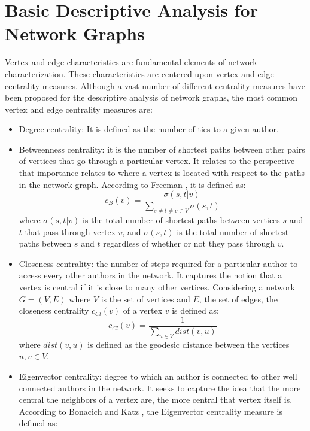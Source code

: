 \section{Basic Descriptive Analysis for Network Graphs}
\label{sec:back_desc}
Vertex and edge characteristics are fundamental elements of network characterization. These characteristics are centered upon vertex and edge centrality measures. Although a vast number of different centrality measures have been proposed for the descriptive analysis of network graphs, the most common vertex and edge centrality measures are:
\begin{itemize}
\item Degree centrality: It is defined as the number of ties to a given author.
\item Betweenness centrality: it is the number of shortest paths between other pairs of vertices that go through a particular vertex. It relates to the perspective that importance relates to where a vertex is located with respect to the paths in the network graph. According to Freeman \cite{freeman_set_1977}, it is defined as:
\begin{equation} 
c_{B}(v)=\frac{\sigma (s,t|v)}{\sum_{s \neq t \neq v \in V}\sigma (s,t)} 
\end{equation} where $\sigma(s,t|v)$ is the total number of shortest paths between vertices $s$ and $t$ that pass through vertex $v$, and $\sigma (s,t)$ is the total number of shortest paths between $s$ and $t$ regardless of whether or not they pass through $v$.
\item Closeness centrality: the number of steps required for a particular author to access every other authors in the network. It captures the notion that a vertex is central if it is close to many other vertices. Considering a network $G=(V,E)$ where $V$ is the set of vertices and $E$, the set of edges, the closeness centrality $c_{Cl}(v)$ of a vertex $v$ is defined as:
\begin{equation} c_{Cl}(v)=\frac{1}{\sum_{u\in V}dist(v,u)} \end{equation} where $dist(v,u)$ is defined as the geodesic distance between the vertices $u,v \in V$.
\item Eigenvector centrality: degree to which an author is connected to other well connected authors in the network. It seeks to capture the idea that the more central the neighbors of a vertex are, the more central that vertex itself is. According to Bonacich \cite{bonacich_factoring_1972} and Katz \cite{katz_new_1953}, the Eigenvector centrality measure is defined as:

\end{itemize}
